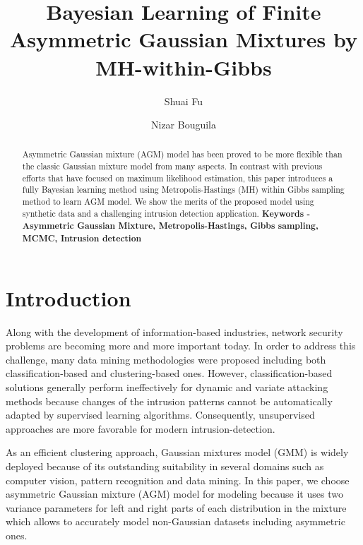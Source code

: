 \documentclass[conference]{llncs}
\begin{document}
\title{Bayesian Learning of Finite Asymmetric Gaussian Mixtures by MH-within-Gibbs}

\author{Shuai Fu \and Nizar Bouguila}



\maketitle

\begin{abstract}
Asymmetric Gaussian mixture (AGM) model has been proved to be more flexible than the classic Gaussian mixture model from many aspects. In contrast with previous efforts that have focused on maximum likelihood estimation, this paper introduces a fully Bayesian learning method using Metropolis-Hastings (MH) within Gibbs sampling method to learn AGM model. We show the merits of the proposed model using synthetic data and a challenging intrusion detection application.
\bigbreak
\textbf{Keywords - Asymmetric Gaussian Mixture, Metropolis-Hastings, Gibbs sampling, MCMC, Intrusion detection}
\end{abstract}

\section{Introduction}
Along with the development of information-based industries, network security problems are becoming more and more important today. In order to address this challenge, many data mining methodologies were proposed including both classification-based \cite{b1} and clustering-based \cite{b2} ones. However, classification-based solutions generally perform ineffectively for dynamic and variate attacking methods because changes of the intrusion patterns cannot be automatically adapted by supervised learning algorithms. Consequently, unsupervised approaches are more favorable for modern intrusion-detection.

As an efficient clustering approach, Gaussian mixtures model (GMM) \cite{b3} is widely deployed because of its outstanding suitability in several domains such as computer vision, pattern recognition and data mining. In this paper, we choose asymmetric Gaussian mixture (AGM) model \cite{b4} for modeling because it uses two variance parameters for left and right parts of each distribution in the mixture which allows to accurately model non-Gaussian datasets including asymmetric ones. 
\end{document}
